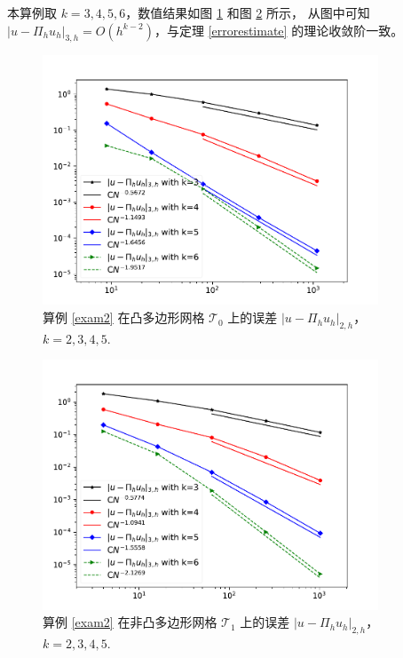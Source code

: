 本算例取 $k = 3, 4, 5, 6$，数值结果如图 \ref{fig:H3error_convex} 和图
\ref{fig:H3error_nonconvex} 所示，
从图中可知 $|u - \Pi_h u_h|_{3, h} = O(h^{k-2})$，与定理 \ref{errorestimate} 的理论收敛阶一致。

\begin{figure}[htbp]
\centering
\includegraphics[width=10cm]{./figures/hmvem/H3_convex.pdf}
\caption{算例 \ref{exam2} 在凸多边形网格 $\mathcal{T}_0$ 上的误差 $|u - \Pi_h u_h|_{2, h}$，$k = 2, 3, 4, 5$.}
\label{fig:H3error_convex}
\end{figure}

\begin{figure}[H]
\centering
\includegraphics[width=10cm]{./figures/hmvem/H3_nonconvex.pdf}
\caption{算例 \ref{exam2} 在非凸多边形网格 $\mathcal{T}_1$ 上的误差 $|u - \Pi_h u_h|_{2, h}$，$k = 2, 3, 4, 5$.}
\label{fig:H3error_nonconvex}
\end{figure}
